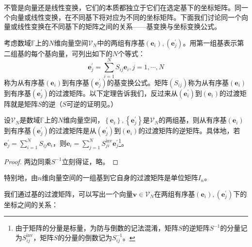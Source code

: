 \documentclass[main.tex]{subfiles}
\begin{document}
不管是向量还是线性变换，它们的本质都独立于它们在选定基下的坐标矩阵。同一个向量或线性变换，在不同基下将对应为不同的坐标矩阵。下面我们讨论同一个向量或线性变换在不同基下的矩阵之间的关系——基变换与坐标变换公式。

考虑数域$\mathbb{F}$上的$N$维向量空间$\mathcal{V}_N$中的两组有序基$\left(\mathbf{e}_i\right),\left(\mathbf{e}^\prime_j\right)$。用第一组基表示第二组基的每个基向量，可列出如下的$N$个等式：
\[\mathbf{e}^\prime_j=\sum_{i=1}^NS_{ij}\mathbf{e}_i,j=1,\cdots,N\]
称为从有序基$\left(\mathbf{e}_i\right)$到有序基$\left(\mathbf{e}^\prime_j\right)$的基变换公式。矩阵$\left(S_{ij}\right)$称为从有序基$\left(\mathbf{e}_i\right)$到有序基$\left(\mathbf{e}^\prime_j\right)$的过渡矩阵。以下定理告诉我们，反过来从$\left(\mathbf{e}_i^\prime\right)$到$\left(\mathbf{e}_i\right)$的过渡矩阵就是矩阵$S$的逆（$S$可逆的证明见\cite[p.~52,例题4.4]{周胜林2012线性代数}。）

\begin{theorem}\label{thm:II.5.1}
设$\mathcal{V}_N$是数域$\mathbb{F}$上的$N$维向量空间，$\left\{\mathbf{e}_i\right\},\left\{\mathbf{e}^\prime_j\right\}$是$\mathcal{V}_N$的两组基，则从有序基$\left(\mathbf{e}_i\right)$到有序基$\left(\mathbf{e}^\prime_j\right)$的过渡矩阵是从$\left(\mathbf{e}^\prime_j\right)$到$\left(\mathbf{e}_i\right)$的过渡矩阵的逆矩阵。具体地，若$\mathbf{e}^\prime_j=\sum_{i=1}^NS_{ij}\mathbf{e}_i$，则$\mathbf{e}_i=\sum_{j=1}^NS^\mathrm{inv}_{ji}\mathbf{e}^\prime_j$\footnote{由于矩阵的分量是标量，为防与倒数的记法混淆，矩阵$S$的逆矩阵$S^{-1}$的分量记为$S^\mathrm{inv}_{ij}$，矩阵$S$的分量的倒数记为$S^{-1}_{ij}$。}。
\end{theorem}
\begin{proof}
两边同乘$S^{-1}$立刻得证，略。
\end{proof}

特别地，由$n$维向量空间的一组基到它自身的过渡矩阵是单位矩阵$I_n$。

我们通过基的过渡矩阵，可以写出一个向量$\mathbf{v}\in\mathcal{V}_N$在两组有序基$\left(\mathbf{e}_i\right),\left(\mathbf{e}^\prime_j\right)$下的坐标之间的关系：
\end{document}
